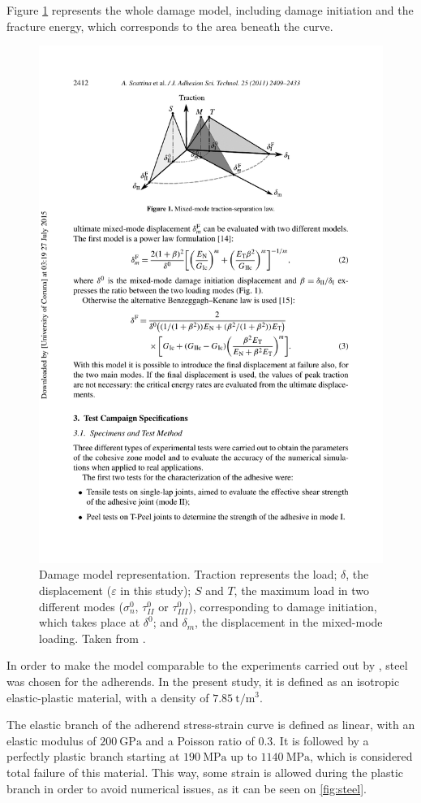 \documentclass[cmfonts]{witpress}
\begin{document}
Figure \ref{fig:damage} represents the whole damage model, including damage initiation and the fracture energy, which corresponds to the area beneath the curve.

\begin{figure}
	\centering
	\includegraphics[width=0.7\linewidth]{figures/IMG_CUTRES/scattina_quads}
	\caption[Damage model representation.]{Damage model representation. Traction represents the load; $\delta$, the displacement ($\varepsilon$ in this study); $S$ and $T$, the maximum load in two different modes ($\sigma_{n}^{0}$, $\tau_{II}^{0}$ or $\tau_{III}^{0}$), corresponding to damage initiation, which takes place at $\delta^0$; and $\delta_m$, the displacement in the mixed-mode loading. Taken from \cite{Scattina2011}.}
	\label{fig:damage}
\end{figure}


In order to make the model comparable to the experiments carried out by \cite{Peroni2009}, steel was chosen for the adherends. In the present study, it is defined as an isotropic elastic-plastic material, with a density of $\SI{7.85}{\tonne/\m^3}$.

The elastic branch of the adherend stress-strain curve is defined as linear, with an elastic modulus of $\SI{200}{\GPa}$ and a Poisson ratio of $\num{0.3}$. It is followed by a perfectly plastic branch starting at $\SI{190}{\MPa}$ up to $\SI{1140}{\MPa}$, which is considered total failure of this material. This way, some strain is allowed during the plastic branch in order to avoid numerical issues, as it can be seen on \cref{fig:steel}.
\end{document}
